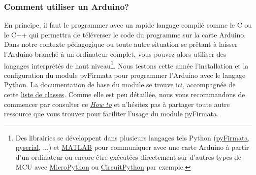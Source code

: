 \documentclass[english,french,12pt]{article}
\begin{document}
\subsubsection*{Comment utiliser un Arduino?}
 En principe, il faut le programmer avec un rapide langage compilé comme le C ou le C++ qui permettra de téléverser le code du programme sur la carte Arduino. Dans notre contexte pédagogique ou toute autre situation se prêtant à laisser l'Arduino branché à un ordinateur complet, vous pouvez alors utiliser des langages interprétés de haut niveau\footnote{Des librairies se développent dans plusieurs langages tels Python (\href{https://github.com/tino/pyFirmata}{pyFirmata}, \href{https://pypi.org/project/pyserial/}{pyserial}, ...) et \href{https://www.mathworks.com/help/supportpkg/arduinoio/examples/getting-started-with-matlab-support-package-for-arduino-hardware.html}{MATLAB} pour communiquer avec une carte Arduino à partir d'un ordinateur ou encore être exécutées directement sur d'autres types de MCU avec \href{https://micropython.org/}{MicroPython} ou \href{https://www.digikey.ca/en/maker/blogs/2018/python-on-hardware}{CircuitPython} par exemple.}. Nous testons cette année l'installation et la configuration du module pyFirmata pour programmer l'Arduino avec le langage Python. La documentation de base du module se trouve \href{https://pyfirmata.readthedocs.io/en/latest/index.html}{ici}, accompagnée de cette \href{https://pyfirmata.readthedocs.io/en/latest/pyfirmata.html}{liste de classes}. Comme elle est peu détaillée, nous vous recommandons de commencer par consulter ce \textit{\href{https://realpython.com/arduino-python/}{How to}} et n'hésitez pas à partager toute autre ressource que vous trouvez pour faciliter l'usage du module pyFirmata.
\end{document}

